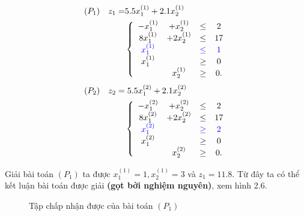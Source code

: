\documentclass[12pt,a4paper]{report}
\begin{document}
    \begin{equation*}
        \begin{split}
            (P_1) \quad z_1= & 5.5x^{(1)}_1 + 2.1x^{(1)}_2 \\
            & \left\{\begin{array} {cccc}
            -x^{(1)}_1 &+ x^{(1)}_2 &\leq& 2 \\
            8x^{(1)}_1 &+ 2x^{(1)}_2 &\leq& 17 \\
            \color{blue} x^{(1)}_1 && \color{blue} \leq &\color{blue} 1 \\
            x^{(1)}_1 &&\geq& 0 \\
            &x^{(1)}_2 &\geq& 0. \\
            \end{array}\right. \\
        \end{split}
    \end{equation*}
   \begin{equation*}
        \begin{split}
            (P_2) \quad z_2= & \hspace{0.1cm} 5.5x^{(2)}_1 + 2.1x^{(2)}_2  \\
            & \left\{\begin{array} {cccc}
            -x^{(2)}_1 &+ x^{(2)}_2 &\leq &2 \\
            8x^{(2)}_1 &+ 2x^{(2)}_2 &\leq &17 \\
            \color{blue} x^{(2)}_1 &&\color{blue}\geq&\color{blue} 2 \\
            x^{(2)}_1 &&\geq& 0 \\
            &x^{(2)}_2 &\geq& 0. \\
            \end{array}\right. \\
        \end{split}
    \end{equation*}

    Giải bài toán $(P_1)$ ta được $x^{(1)}_1=1, x^{(1)}_2=3$ và $z_1=11.8$. Từ đây ta có thể kết luận bài toán được giải \textbf{(gọt bởi nghiệm nguyên)}, xem hình 2.6.
    \begin{figure}
	\center
    \caption{Tập chấp nhận được của bài toán $(P_1)$}
    \end{figure}
\end{document}
